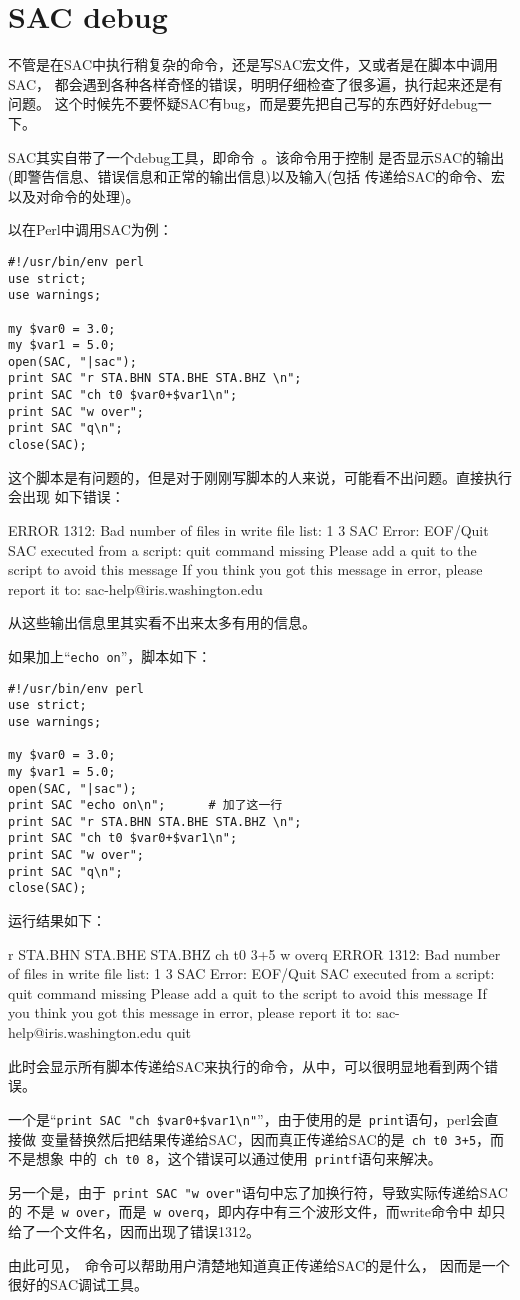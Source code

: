 \section{SAC debug}
不管是在SAC中执行稍复杂的命令，还是写SAC宏文件，又或者是在脚本中调用SAC，
都会遇到各种各样奇怪的错误，明明仔细检查了很多遍，执行起来还是有问题。
这个时候先不要怀疑SAC有bug，而是要先把自己写的东西好好debug一下。

SAC其实自带了一个debug工具，即命令~。该命令用于控制
是否显示SAC的输出(即警告信息、错误信息和正常的输出信息)以及输入(包括
传递给SAC的命令、宏以及对命令的处理)。

以在Perl中调用SAC为例：
\begin{verbatim}
#!/usr/bin/env perl
use strict;
use warnings;

my $var0 = 3.0;
my $var1 = 5.0;
open(SAC, "|sac");
print SAC "r STA.BHN STA.BHE STA.BHZ \n";
print SAC "ch t0 $var0+$var1\n";
print SAC "w over";
print SAC "q\n";
close(SAC);
\end{verbatim}

这个脚本是有问题的，但是对于刚刚写脚本的人来说，可能看不出问题。直接执行会出现
如下错误：
\begin{SACCode}
 ERROR 1312: Bad number of files in write file list: 1 3
SAC Error: EOF/Quit
     SAC executed from a script: quit command missing
     Please add a quit to the script to avoid this message
     If you think you got this message in error,
     please report it to: sac-help@iris.washington.edu
\end{SACCode}
从这些输出信息里其实看不出来太多有用的信息。

如果加上``\verb+echo on+''，脚本如下：
\begin{verbatim}
#!/usr/bin/env perl
use strict;
use warnings;

my $var0 = 3.0;
my $var1 = 5.0;
open(SAC, "|sac");
print SAC "echo on\n";      # 加了这一行
print SAC "r STA.BHN STA.BHE STA.BHZ \n";
print SAC "ch t0 $var0+$var1\n";
print SAC "w over";
print SAC "q\n";
close(SAC);
\end{verbatim}

运行结果如下：
\begin{SACCode}
 r STA.BHN STA.BHE STA.BHZ
 ch t0 3+5
 w overq
 ERROR 1312: Bad number of files in write file list: 1 3
SAC Error: EOF/Quit
     SAC executed from a script: quit command missing
     Please add a quit to the script to avoid this message
     If you think you got this message in error,
     please report it to: sac-help@iris.washington.edu
 quit
\end{SACCode}
此时会显示所有脚本传递给SAC来执行的命令，从中，可以很明显地看到两个错误。

一个是``\verb!print SAC "ch $var0+$var1\n"!''，由于使用的是~\verb+print+语句，perl会直接做
变量替换然后把结果传递给SAC，因而真正传递给SAC的是~\verb!ch t0 3+5!，而不是想象
中的~\verb+ch t0 8+，这个错误可以通过使用~\verb+printf+语句来解决。

另一个是，由于~\verb+print SAC "w over"+语句中忘了加换行符，导致实际传递给SAC的
不是~\verb+w over+，而是~\verb+w overq+，即内存中有三个波形文件，而write命令中
却只给了一个文件名，因而出现了错误1312。

由此可见，~命令可以帮助用户清楚地知道真正传递给SAC的是什么，
因而是一个很好的SAC调试工具。
